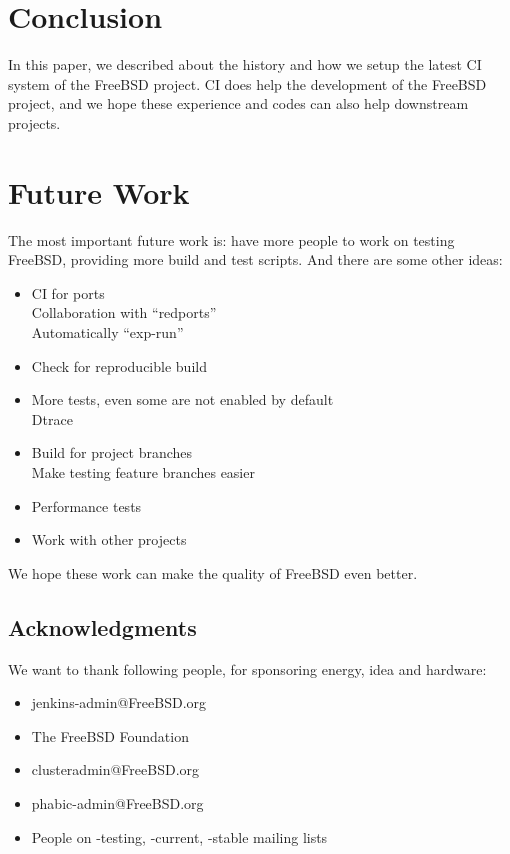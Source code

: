 \documentclass[a4paper,twocolumn,10pt]{article}
\begin{document}
\section{Conclusion}

In this paper, we described about the history and how we setup the latest CI
system of the FreeBSD project.  CI does help the development of the FreeBSD
project, and we hope these experience and codes can also help downstream
projects.

\section{Future Work}

The most important future work is: have more people to work on testing FreeBSD,
providing more build and test scripts. And there are some other ideas:

\begin{itemize}
\item CI for ports\\
  Collaboration with ``redports''\\
  Automatically ``exp-run''
\item Check for reproducible build
\item More tests, even some are not enabled by default\\
Dtrace
\item Build for project branches\\
Make testing feature branches easier
\item Performance tests
\item Work with other projects
\end{itemize}

We hope these work can make the quality of FreeBSD even better.

\subsection*{Acknowledgments}

We want to thank following people, for sponsoring energy, idea and hardware:

\begin{itemize}
\item jenkins-admin@FreeBSD.org
\item The FreeBSD Foundation
\item clusteradmin@FreeBSD.org
\item phabic-admin@FreeBSD.org
\item People on -testing, -current, -stable mailing lists
\end{itemize}
\end{document}
